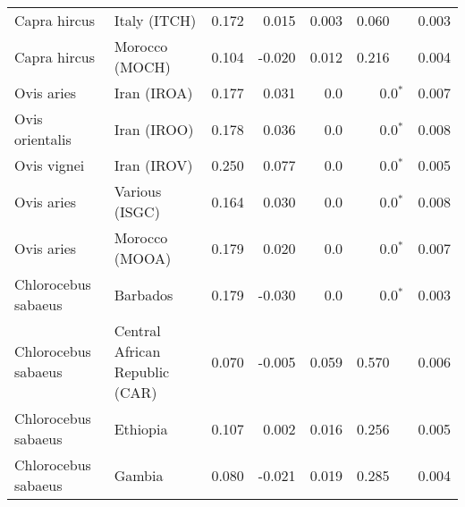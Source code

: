 \begin{center}
\begin{adjustbox}{width = 1\textwidth}
\begin{tabular}{|l|l|r|r|r|r|r|}
        Capra hircus &                    Italy (ITCH) &                 0.172 &                                0.015 &                0.003 &                                  0.060~~ &              0.003 \\
        Capra hircus &                  Morocco (MOCH) &                 0.104 &                               -0.020 &                0.012 &                                  0.216~~ &              0.004 \\
          Ovis aries &                     Iran (IROA) &                 0.177 &                                0.031 &                  0.0 &                             0.0$\bm{^*}$ &              0.007 \\
     Ovis orientalis &                     Iran (IROO) &                 0.178 &                                0.036 &                  0.0 &                             0.0$\bm{^*}$ &              0.008 \\
         Ovis vignei &                     Iran (IROV) &                 0.250 &                                0.077 &                  0.0 &                             0.0$\bm{^*}$ &              0.005 \\
          Ovis aries &                  Various (ISGC) &                 0.164 &                                0.030 &                  0.0 &                             0.0$\bm{^*}$ &              0.008 \\
          Ovis aries &                  Morocco (MOOA) &                 0.179 &                                0.020 &                  0.0 &                             0.0$\bm{^*}$ &              0.007 \\
 Chlorocebus sabaeus &                        Barbados &                 0.179 &                               -0.030 &                  0.0 &                             0.0$\bm{^*}$ &              0.003 \\
 Chlorocebus sabaeus &  Central African Republic (CAR) &                 0.070 &                               -0.005 &                0.059 &                                  0.570~~ &              0.006 \\
 Chlorocebus sabaeus &                        Ethiopia &                 0.107 &                                0.002 &                0.016 &                                  0.256~~ &              0.005 \\
 Chlorocebus sabaeus &                          Gambia &                 0.080 &                               -0.021 &                0.019 &                                  0.285~~ &              0.004 \\

\end{tabular}
\end{adjustbox}
\end{center}
